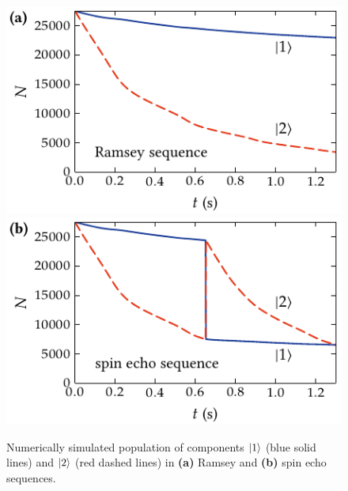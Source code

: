 \begin{figure}
    \centerline{%
    \includegraphics{figures_generated/bec_noise/ramsey_single_run_pop.pdf}%
    \includegraphics{figures_generated/bec_noise/echo_single_run_pop.pdf}}

    \caption{Numerically simulated population of components $\mbox{\ensuremath{\left\vert 1 \right\rangle}}$ (blue solid lines) and $\mbox{\ensuremath{\left\vert 2 \right\rangle}}$ (red dashed lines) in \textbf{(a)} Ramsey and \textbf{(b)} spin echo sequences.}%

    \label{fig:bec-noise:visibility:population}
\end{figure}

